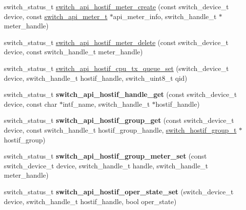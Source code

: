 \begin{DoxyCompactItemize}
\item 
switch\+\_\+status\+\_\+t \hyperlink{group__HostInterface_ga41264be91adc3843ff3e59b9906d53bc}{switch\+\_\+api\+\_\+hostif\+\_\+meter\+\_\+create} (const switch\+\_\+device\+\_\+t device, const \hyperlink{group__Meters_ga39b6cf8a3c569d2feee8e369fbc90bb4}{switch\+\_\+api\+\_\+meter\+\_\+t} $\ast$api\+\_\+meter\+\_\+info, switch\+\_\+handle\+\_\+t $\ast$meter\+\_\+handle)
\item 
switch\+\_\+status\+\_\+t \hyperlink{group__HostInterface_gac8a864a038cb353d6b09a08093bef01f}{switch\+\_\+api\+\_\+hostif\+\_\+meter\+\_\+delete} (const switch\+\_\+device\+\_\+t device, const switch\+\_\+handle\+\_\+t meter\+\_\+handle)
\item 
switch\+\_\+status\+\_\+t \hyperlink{group__HostInterface_gae606f4e68dd2d3ecb4615b5558a50916}{switch\+\_\+api\+\_\+hostif\+\_\+cpu\+\_\+tx\+\_\+queue\+\_\+set} (switch\+\_\+device\+\_\+t device, switch\+\_\+handle\+\_\+t hostif\+\_\+handle, switch\+\_\+uint8\+\_\+t qid)
\item 
\hypertarget{group__HostInterface_gae78263c89e8d6474df4fb6fa59c21339}{switch\+\_\+status\+\_\+t {\bfseries switch\+\_\+api\+\_\+hostif\+\_\+handle\+\_\+get} (const switch\+\_\+device\+\_\+t device, const char $\ast$intf\+\_\+name, switch\+\_\+handle\+\_\+t $\ast$hostif\+\_\+handle)}\label{group__HostInterface_gae78263c89e8d6474df4fb6fa59c21339}

\item 
\hypertarget{group__HostInterface_ga0e1b5fac3b4eea4416d3214d814d6c47}{switch\+\_\+status\+\_\+t {\bfseries switch\+\_\+api\+\_\+hostif\+\_\+group\+\_\+get} (const switch\+\_\+device\+\_\+t device, const switch\+\_\+handle\+\_\+t hostif\+\_\+group\+\_\+handle, \hyperlink{group__HostInterface_gaaacd1815b505c965d68a7604f211d907}{switch\+\_\+hostif\+\_\+group\+\_\+t} $\ast$hostif\+\_\+group)}\label{group__HostInterface_ga0e1b5fac3b4eea4416d3214d814d6c47}

\item 
\hypertarget{group__HostInterface_ga4586dd4f3c3af36c50e36f477e658032}{switch\+\_\+status\+\_\+t {\bfseries switch\+\_\+api\+\_\+hostif\+\_\+group\+\_\+meter\+\_\+set} (const switch\+\_\+device\+\_\+t device, switch\+\_\+handle\+\_\+t handle, switch\+\_\+handle\+\_\+t meter\+\_\+handle)}\label{group__HostInterface_ga4586dd4f3c3af36c50e36f477e658032}

\item 
\hypertarget{group__HostInterface_gaf8c922a1a89bc1637ae069a19177e6f2}{switch\+\_\+status\+\_\+t {\bfseries switch\+\_\+api\+\_\+hostif\+\_\+oper\+\_\+state\+\_\+set} (switch\+\_\+device\+\_\+t device, switch\+\_\+handle\+\_\+t hostif\+\_\+handle, bool oper\+\_\+state)}\label{group__HostInterface_gaf8c922a1a89bc1637ae069a19177e6f2}


\end{DoxyCompactItemize}

